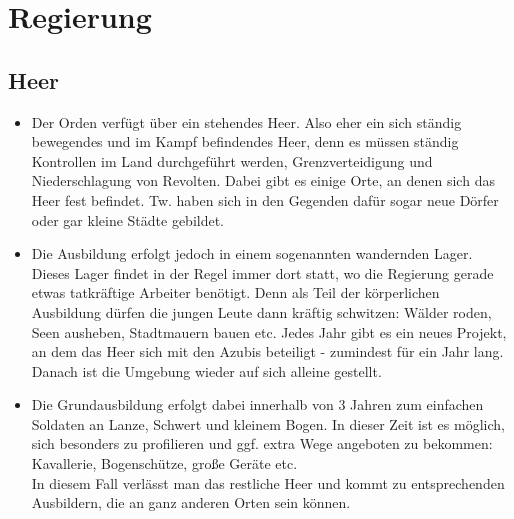 \chapter{Regierung} \label{ch:regierung}

\section{Heer}
\begin{itemize}
	\item Der Orden verfügt über ein stehendes Heer. 
		Also eher ein sich ständig bewegendes und im Kampf befindendes Heer, denn es müssen ständig Kontrollen im Land durchgeführt werden, Grenzverteidigung und Niederschlagung von Revolten. 
		Dabei gibt es einige Orte, an denen sich das Heer fest befindet. 
		Tw. haben sich in den Gegenden dafür sogar neue Dörfer oder gar kleine Städte gebildet.
	\item Die Ausbildung erfolgt jedoch in einem sogenannten wandernden Lager. 
		Dieses Lager findet in der Regel immer dort statt, wo die Regierung gerade etwas tatkräftige Arbeiter benötigt. 
		Denn als Teil der körperlichen Ausbildung dürfen die jungen Leute dann kräftig schwitzen: Wälder roden, Seen ausheben, Stadtmauern bauen etc. 
		Jedes Jahr gibt es ein neues Projekt, an dem das Heer sich mit den Azubis beteiligt - zumindest für ein Jahr lang. 
		Danach ist die Umgebung wieder auf sich alleine gestellt.
	\item Die Grundausbildung erfolgt dabei innerhalb von 3 Jahren zum einfachen Soldaten an Lanze, Schwert und kleinem Bogen. 
		In dieser Zeit ist es möglich, sich besonders zu profilieren und ggf. extra Wege angeboten zu bekommen: Kavallerie, Bogenschütze, große Geräte etc. \\ 
		In diesem Fall verlässt man das restliche Heer und kommt zu entsprechenden Ausbildern, die an ganz anderen Orten sein können.
\end{itemize}